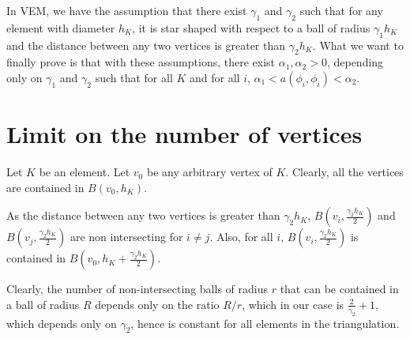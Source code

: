 \documentclass[12pt]{article}
\begin{document}
 In VEM, we have the assumption that there exist $\gamma_1$ and $\gamma_2$ such that for any element with diameter $h_K$, it is star shaped with respect to a ball of radius $\gamma_1 h_K$ and the distance between any two vertices is greater than $\gamma_2 h_K$.
  What we want to finally prove is that with these assumptions, there exist $\alpha_1,\alpha_2>0$, depending only on $\gamma_1$ and $\gamma_2$ such that for all $K$ and for all $i$, $\alpha_1 < a(\phi_i,\phi_i)<\alpha_2$.
\pagebreak

\section{Limit on the number of vertices}

Let $K$ be an element. Let $v_0$ be any arbitrary vertex of $K$. Clearly, all the vertices are contained in $B(v_0,h_K)$.

As the distance between any two vertices is greater than $\gamma_2 h_K$, $B(v_i,\frac{\gamma_2 h_K}{2})$ and $B(v_j,\frac{\gamma_2 h_K}{2})$ are non intersecting for $i \ne j$. Also, for all $i$, $B(v_i,\frac{\gamma_2 h_K}{2})$ is contained in $B(v_0,h_K+\frac{\gamma_2 h_K}{2})$.

Clearly, the number of non-intersecting balls of radius $r$ that can be contained in a ball of radius $R$ depends only on the ratio $R/r$, which in our case is $\frac{2}{\gamma_2}+1$, which depends only on $\gamma_2$, hence is constant for all elements in the triangulation.
\end{document}
